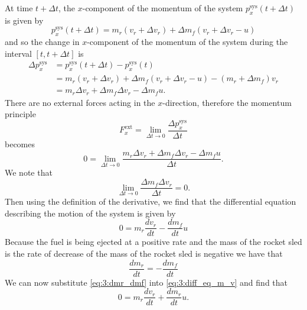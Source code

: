 \documentclass[solutions]{esg8012exam}
\begin{document}
\begin{enumerate}[(a)]
      At time $t+\Delta t$, the $x$-component of the momentum of the system $p_x^\text{sys} (t+\Delta t)$ is given by
      \begin{equation} p_x^\text{sys} (t+\Delta t) = m_r (v_r +\Delta v_r )+\Delta m_f (v_r +\Delta v_r -u) \label{eq:3:p_x^sys(t+delta_t)} \end{equation}
      and so the change in $x$-component of the momentum of the system during the interval $[t,t+\Delta t]$ is
      \begin{align}
        \Delta p_x^\text{sys} & = p_x^\text{sys} (t+\Delta t)-p_x^\text{sys} (t) \nonumber \\
          & = m_r (v_r +\Delta v_r )+\Delta m_f (v_r +\Delta v_r -u)-(m_r +\Delta m_f )v_r \nonumber \\
          & = m_r \Delta v_r +\Delta m_f \Delta v_r -\Delta m_f u. \label{eq:3:delta_p_x^sys}
      \end{align}
      There are no external forces acting in the $x$-direction, therefore the momentum principle
      \begin{equation} F_x^\text{ext} =\lim_{\Delta t\to 0} \frac{\Delta p_x^\text{sys} }{\Delta t} \label{eq:3:F_x^ext=lim} \end{equation}
      becomes
      \begin{equation} 0 = \lim_{\Delta t\to 0} \frac{m_r \Delta v_r +\Delta m_f \Delta v_r -\Delta m_f u}{\Delta t}. \label{eq:3:expanded_F_ext} \end{equation}
      We note that
      \begin{equation} \lim_{\Delta t\to 0} \frac{\Delta m_f \Delta v_r }{\Delta t}=0. \label{eq:3:second_order_differential_zero} \end{equation}
      Then using the definition of the derivative, we find that the differential equation describing the motion of the system is given by
      \begin{equation} 0=m_r \frac{dv_r }{dt}-\frac{dm_f }{dt}u \label{eq:3:diff_eq_m_v} \end{equation}
      Because the fuel is being ejected at a positive rate and the mass of the rocket sled is the rate of decrease of the mass of the rocket sled is  negative we have that
      \begin{equation} \frac{dm_r }{dt}=-\frac{dm_f }{dt} \label{eq:3:dmr_dmf} \end{equation}
      We can now substitute \autoref{eq:3:dmr_dmf} into \autoref{eq:3:diff_eq_m_v} and find that
      \begin{equation} 0=m_r \frac{dv_r }{dt}+\frac{dm_r }{dt}u. \label{eq:3:diff_eq_mr_v} \end{equation}

\end{enumerate}
\end{document}
